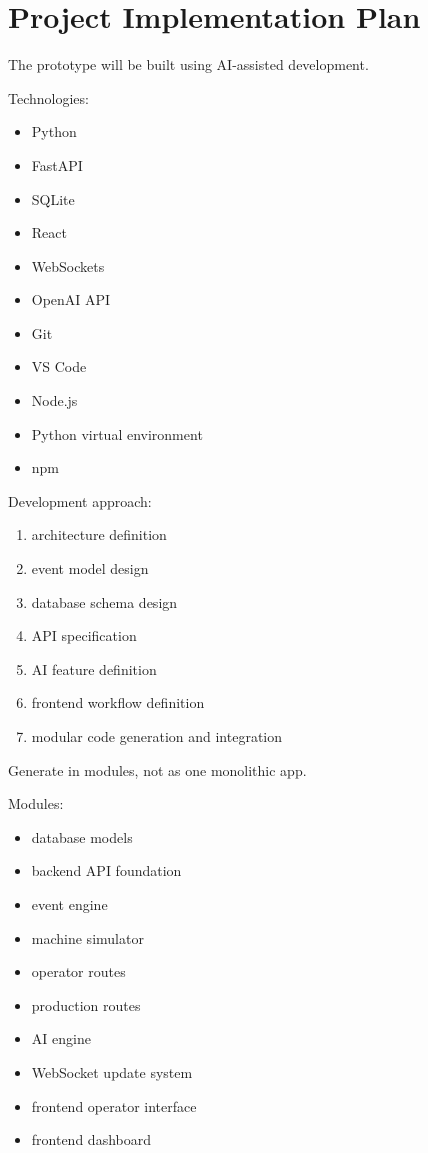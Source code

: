 \documentclass[11pt]{article}
\begin{document}
\section{Project Implementation Plan}
The prototype will be built using AI-assisted development.

Technologies:
\begin{itemize}
\item Python
\item FastAPI
\item SQLite
\item React
\item WebSockets
\item OpenAI API
\item Git
\item VS Code
\item Node.js
\item Python virtual environment
\item npm
\end{itemize}

Development approach:
\begin{enumerate}
\item architecture definition
\item event model design
\item database schema design
\item API specification
\item AI feature definition
\item frontend workflow definition
\item modular code generation and integration
\end{enumerate}

Generate in modules, not as one monolithic app.

Modules:
\begin{itemize}
\item database models
\item backend API foundation
\item event engine
\item machine simulator
\item operator routes
\item production routes
\item AI engine
\item WebSocket update system
\item frontend operator interface
\item frontend dashboard
\end{itemize}
\end{document}
